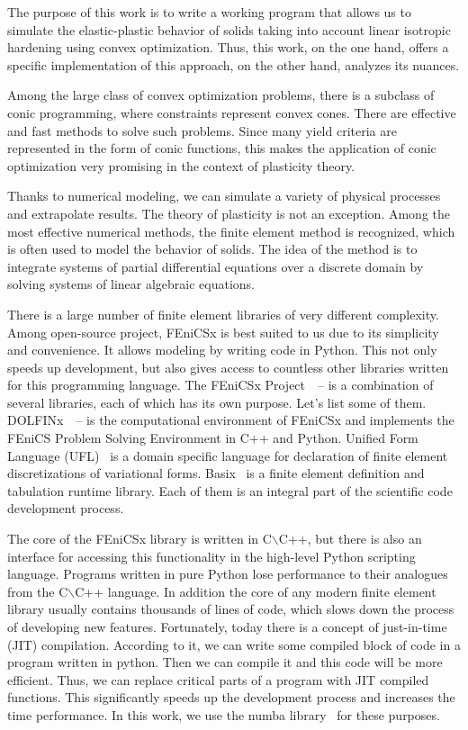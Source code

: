 \documentclass[12pt]{article}
\begin{document}
The purpose of this work is to write a working program that allows us to simulate the elastic-plastic behavior of solids taking into account linear isotropic hardening using convex optimization. Thus, this work, on the one hand, offers a specific implementation of this approach, on the other hand, analyzes its nuances.

Among the large class of convex optimization problems, there is a subclass of conic programming, where constraints represent convex cones. There are effective and fast methods to solve such problems. Since many yield criteria are represented in the form of conic functions, this makes the application of conic optimization very promising in the context of plasticity theory.

Thanks to numerical modeling, we can simulate a variety of physical processes and extrapolate results. The theory of plasticity is not an exception. Among the most effective numerical methods, the finite element method is recognized, which is often used to model the behavior of solids. The idea of the method is to integrate systems of partial differential equations over a discrete domain by solving systems of linear algebraic equations. 

There is a large number of finite element libraries of very different complexity. Among open-source project, FEniCSx is best suited to us due to its simplicity and convenience. It allows modeling by writing code in Python. This not only speeds up development, but also gives access to countless other libraries written for this programming language. The FEniCSx Project~\parencite{FEniCS2015}~--\parencite{LoggEtal2012} is a combination of several libraries, each of which has its own purpose. Let's list some of them. DOLFINx~\parencite{LoggWells2010}~--\parencite{LoggEtal_10_2012} is the computational environment of FEniCSx and implements the FEniCS Problem Solving Environment in C++ and Python. Unified Form Language (UFL)~\parencite{UFL2014} is a domain specific language for declaration of finite element discretizations of variational forms. Basix~\parencite{BasixJoss} is a finite element definition and tabulation runtime library. Each of them is an integral part of the scientific code development process.

The core of the FEniCSx library is written in C$\backslash$C++, but there is also an interface for accessing this functionality in the high-level Python scripting language. Programs written in pure Python lose performance to their analogues from the C$\backslash$C++ language. In addition the core of any modern finite element library usually contains thousands of lines of code, which slows down the process of developing new features. Fortunately, today there is a concept of just-in-time (JIT) compilation. According to it, we can write some compiled block of code in a program written in python. Then we can compile it and this code will be more efficient. Thus, we can replace critical parts of a program with JIT compiled functions. This significantly speeds up the development process and increases the time performance. In this work, we use the numba library~\parencite{Numba2015} for these purposes. 
\end{document}
